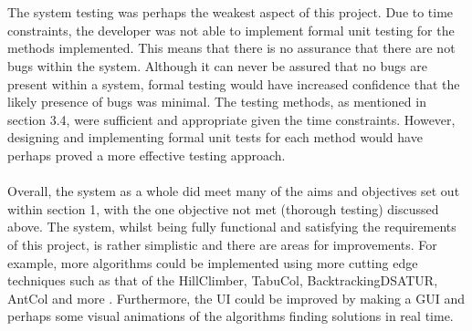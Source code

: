 \\\\
The system testing was perhaps the weakest aspect of this project. Due to time constraints, the developer was not able to implement formal unit testing for the methods implemented. This means that there is no assurance that there are not bugs within the system. Although it can never be assured that no bugs are present within a system, formal testing would have increased confidence that the likely presence of bugs was minimal. The testing methods, as mentioned in section 3.4, were sufficient and appropriate given the time constraints. However, designing and implementing formal unit tests for each method would have perhaps proved a more effective testing approach. 
\\\\
Overall, the system as a whole did meet many of the aims and objectives set out within section 1, with the one objective not met (thorough testing) discussed above. The system, whilst being fully functional and satisfying the requirements of this project, is rather simplistic and there are areas for improvements. For example, more algorithms could be implemented using more cutting edge techniques such as that of the HillClimber, TabuCol, BacktrackingDSATUR, AntCol and more \cite{LEWISHillClimber, LewisR.M.R2015AGtG, LEWIS20121933}. Furthermore, the UI could be improved by making a GUI and perhaps some visual animations of the algorithms finding solutions in real time. 

